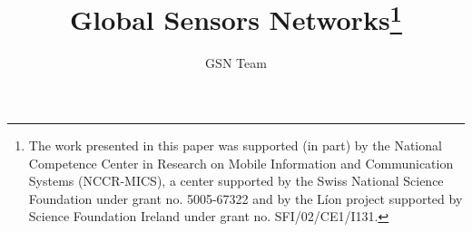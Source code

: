 \documentclass[a4paper,oneside,10pt]{book}
\title{Global Sensors Networks\thanks{The work presented in this paper was supported (in
    part) by the National Competence Center in Research on Mobile Information
    and Communication Systems (NCCR-MICS), a center supported by the Swiss
    National Science Foundation under grant no. 5005-67322 and by the L\'ion
    project supported by Science Foundation Ireland under grant no.
    SFI/02/CE1/I131.}}
\author{GSN Team}
\begin{document}
	\maketitle
	\tableofcontents	
	
	
	
	\listoffigures
	\listoftables	
	\lstlistoflistings
	
	\appendix
	
	
	
	
	
\end{document}
